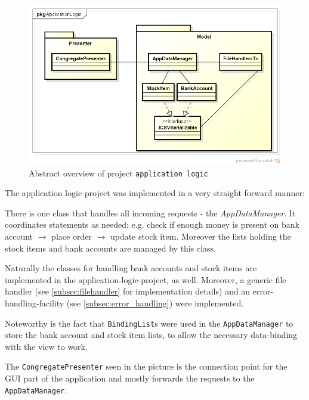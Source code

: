 \begin{figure}[H]
\begin{center}
\includegraphics[width=\textwidth]{gfx/application_logic.png}
\caption{Abstract overview of project \texttt{application logic}}
\label{fig:application_logic}
\end{center}
\end{figure}

The application logic project was implemented in a very straight forward manner:

There is one class that handles all incoming requests - the \textit{AppDataManager}. 
It coordinates statements as needed: e.g. check if enough money is present on bank account $\rightarrow$ place order $\rightarrow$ update stock item.
Moreover the lists holding the stock items and bank accounts are managed by this class.

Naturally the classes for handling bank accounts and stock items are implemented in the application-logic-project, as well. Moreover, a generic file handler (see \autoref{subsec:filehandler} for implementation details) and an error-handling-facility (see \autoref{subsec:error_handling}) were implemented.

Noteworthy is the fact that \texttt{BindingList}s were used in the \texttt{AppDataManager} to store the bank account and stock item lists, to allow the necessary data-binding with the view to work.

The \texttt{CongregatePresenter} seen in the picture is the connection point for the \ac{GUI} part of the application and mostly forwards the requests to the \texttt{AppDataManager}.